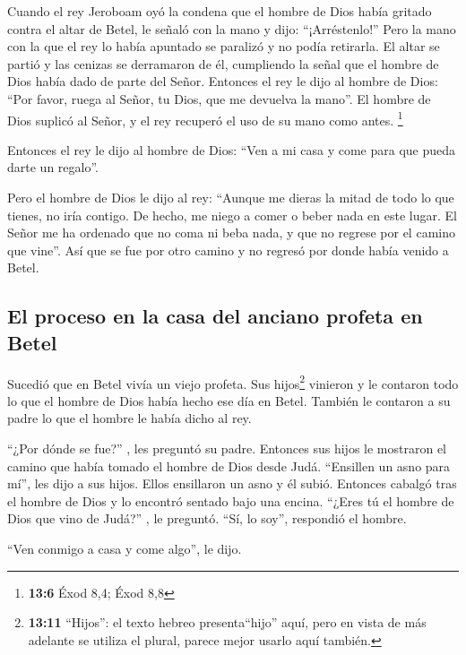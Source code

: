 Cuando el rey Jeroboam oyó la condena que el hombre de
Dios había gritado contra el altar de Betel, le señaló con la mano y
dijo: ``¡Arréstenlo!'' Pero la mano con la que el rey lo había apuntado
se paralizó y no podía retirarla.  El altar se partió y
las cenizas se derramaron de él, cumpliendo la señal que el hombre de
Dios había dado de parte del Señor.  Entonces el rey le
dijo al hombre de Dios: ``Por favor, ruega al Señor, tu Dios, que me
devuelva la mano''. El hombre de Dios suplicó al Señor, y el rey
recuperó el uso de su mano como antes. \footnote{\textbf{13:6} Éxod 8,4;
  Éxod 8,8}

 Entonces el rey le dijo al hombre de Dios: ``Ven a mi
casa y come para que pueda darte un regalo''.

 Pero el hombre de Dios le dijo al rey: ``Aunque me dieras
la mitad de todo lo que tienes, no iría contigo. De hecho, me niego a
comer o beber nada en este lugar.  El Señor me ha ordenado
que no coma ni beba nada, y que no regrese por el camino que vine''.
 Así que se fue por otro camino y no regresó por donde
había venido a Betel.

\hypertarget{el-proceso-en-la-casa-del-anciano-profeta-en-betel}{%
\subsection{El proceso en la casa del anciano profeta en
Betel}\label{el-proceso-en-la-casa-del-anciano-profeta-en-betel}}

 Sucedió que en Betel vivía un viejo profeta. Sus
hijos\footnote{\textbf{13:11} ``Hijos'': el texto hebreo
  presenta``hijo'' aquí, pero en vista de más adelante se utiliza el
  plural, parece mejor usarlo aquí también.} vinieron y le contaron todo
lo que el hombre de Dios había hecho ese día en Betel. También le
contaron a su padre lo que el hombre le había dicho al rey.

 ``¿Por dónde se fue?'' , les preguntó su padre. Entonces
sus hijos le mostraron el camino que había tomado el hombre de Dios
desde Judá.  ``Ensillen un asno para mí'', les dijo a sus
hijos. Ellos ensillaron un asno y él subió.  Entonces
cabalgó tras el hombre de Dios y lo encontró sentado bajo una encina.
``¿Eres tú el hombre de Dios que vino de Judá?'' , le preguntó. ``Sí, lo
soy'', respondió el hombre.

 ``Ven conmigo a casa y come algo'', le dijo.

